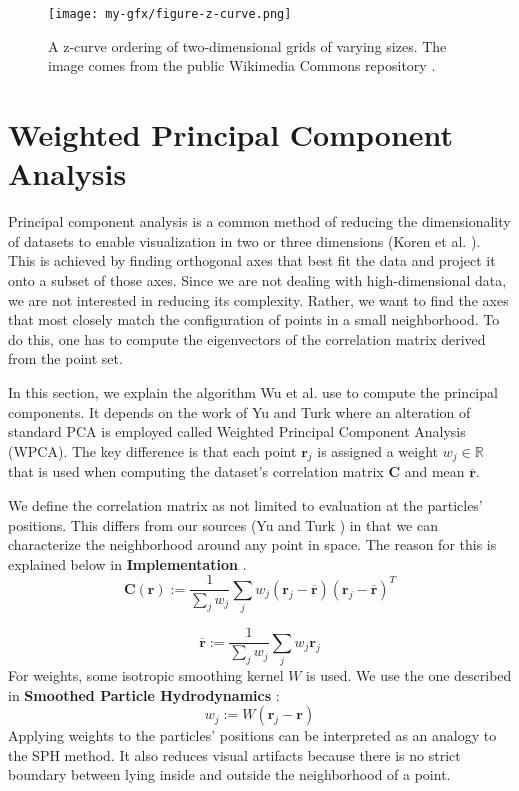 \begin{figure}[htb]
    \centering
    \texttt{[image: my-gfx/figure-z-curve.png]}
    \caption{A z-curve ordering of two-dimensional grids of varying sizes. The image comes from the public Wikimedia Commons repository \cite{ZCurve}.}
    \label{fig:z-curve}
\end{figure}


\section{Weighted Principal Component Analysis}

Principal component analysis is a common method of reducing the dimensionality of datasets to enable visualization in two or three dimensions (Koren et al. \cite{Koren:2003}). This is achieved by finding orthogonal axes that best fit the data and project it onto a subset of those axes. Since we are not dealing with high-dimensional data, we are not interested in reducing its complexity. Rather, we want to find the axes that most closely match the configuration of points in a small neighborhood. To do this, one has to compute the eigenvectors of the correlation matrix derived from the point set.

In this section, we explain the algorithm Wu et al. use to compute the principal components. It depends on the work of Yu and Turk \cite{Yu:2013} where an alteration of standard PCA is employed called Weighted Principal Component Analysis (WPCA). The key difference is that each point $\textbf{r}_j$ is assigned a weight $w_{j} \in \mathbb{R}$ that is used when computing the dataset's correlation matrix $\textbf{C}$ and mean $\overline{\textbf{r}}$.

We define the correlation matrix as not limited to evaluation at the particles' positions. This differs from our sources (Yu and Turk \cite{Yu:2013}) in that we can characterize the neighborhood around any point in space. The reason for this is explained below in \textbf{Implementation }.
\[
\textbf{C}(\textbf{r}) :=
\frac{1}{\sum_j w_{j}}
\sum_j w_j (\textbf{r}_j - \overline{\textbf{r}}) (\textbf{r}_j - \overline{\textbf{r}})^T
\]

\[
\overline{\textbf{r}} :=
\frac{1}{\sum_j w_j}
\sum_j w_j \textbf{r}_j
\]
For weights, some isotropic smoothing kernel $W$ is used. We use the one described in \textbf{Smoothed Particle Hydrodynamics }:
\[ w_j := W(\textbf{r}_j - \textbf{r}) \]
Applying weights to the particles' positions can be interpreted as an analogy to the SPH method. It also reduces visual artifacts because there is no strict boundary between lying inside and outside the neighborhood of a point.

